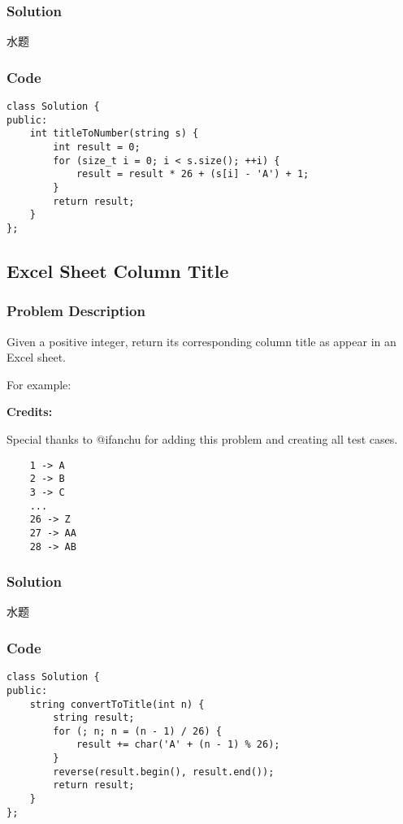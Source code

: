 \documentclass[courier]{article}
\begin{document}
\begin{CJK*}{UTF8}{gkai}
\subsubsection*{Solution}
水题

\subsubsection*{Code}
\begin{lstlisting}
class Solution {
public:
    int titleToNumber(string s) {
        int result = 0;
        for (size_t i = 0; i < s.size(); ++i) {
            result = result * 26 + (s[i] - 'A') + 1;
        }
        return result;
    }
}; 
\end{lstlisting}


\subsection{ Excel Sheet Column Title }

\subsubsection*{Problem Description}
Given a positive integer, return its corresponding column title as appear in an Excel sheet.

For example:

\textbf{Credits:}

Special thanks to @ifanchu for adding this problem and creating all test cases.

\begin{verbatim}
    1 -> A
    2 -> B
    3 -> C
    ...
    26 -> Z
    27 -> AA
    28 -> AB 
\end{verbatim}


\subsubsection*{Solution}
水题

\subsubsection*{Code}
\begin{lstlisting}
class Solution {
public:
    string convertToTitle(int n) {
        string result;
        for (; n; n = (n - 1) / 26) {
            result += char('A' + (n - 1) % 26);
        }
        reverse(result.begin(), result.end());
        return result;
    }
}; 
\end{lstlisting}



\end{CJK*}
\end{document}
